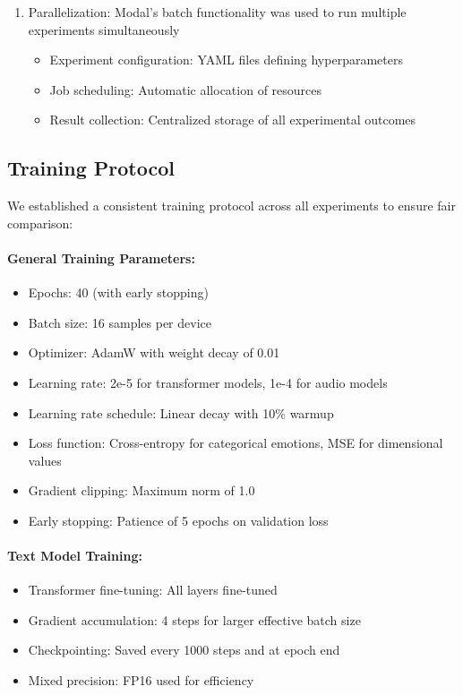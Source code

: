 \documentclass[12pt]{article}
\begin{document}
\begin{enumerate}
    \item Parallelization: Modal's batch functionality was used to run multiple experiments simultaneously
    \begin{itemize}
        \item Experiment configuration: YAML files defining hyperparameters
        \item Job scheduling: Automatic allocation of resources
        \item Result collection: Centralized storage of all experimental outcomes
    \end{itemize}
\end{enumerate}

\subsection{Training Protocol}
We established a consistent training protocol across all experiments to ensure fair comparison:

\paragraph{General Training Parameters:}
\begin{itemize}
    \item Epochs: 40 (with early stopping)
    \item Batch size: 16 samples per device
    \item Optimizer: AdamW with weight decay of 0.01
    \item Learning rate: 2e-5 for transformer models, 1e-4 for audio models
    \item Learning rate schedule: Linear decay with 10\% warmup
    \item Loss function: Cross-entropy for categorical emotions, MSE for dimensional values
    \item Gradient clipping: Maximum norm of 1.0
    \item Early stopping: Patience of 5 epochs on validation loss
\end{itemize}

\paragraph{Text Model Training:}
\begin{itemize}
    \item Transformer fine-tuning: All layers fine-tuned
    \item Gradient accumulation: 4 steps for larger effective batch size
    \item Checkpointing: Saved every 1000 steps and at epoch end
    \item Mixed precision: FP16 used for efficiency
\end{itemize}
\end{document}
